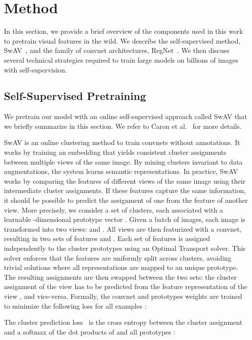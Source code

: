 \documentclass[final]{cvpr}
\begin{document}
\section{Method}

In this section, we provide a brief overview of the components used in this work to pretrain visual features in the wild.
We describe the self-supervised method, SwAV~\cite{caron2020unsupervised}, and the family of convnet architectures, RegNet~\cite{radosavovic2020designing}. 
We then discuss several technical strategies required to train large models on billions of images with self-supervision.

\subsection{Self-Supervised Pretraining}

We pretrain our model with an online self-supervised approach called SwAV that we briefly summarize in this section.
We refer to Caron et al.~\cite{caron2020unsupervised} for more details.

SwAV is an online clustering method to train convnets without annotations. It works by training an embedding that yields consistent cluster assignments between multiple views of the same image.
By mining clusters invariant to data augmentations, the system learns semantic representations.
In practice, SwAV works by comparing the features of different views of the same image using their intermediate cluster assignments.
If these features capture the same information, it should be possible to predict the assignment of one from the feature of another view.
More precisely, we consider a set of  clusters, each associated with a learnable -dimensional prototype vector .
Given a batch of  images, each image  is transformed into two views:  and .
All views are then featurized with a convnet, resulting in two sets of features  and .
Each set of features is assigned independently to the cluster prototypes using an Optimal Transport solver.
This solver enforces that the features are uniformly split across clusters, avoiding trivial solutions where all representations are mapped to an unique prototype.
The resulting assignments are then swapped between the two sets: the cluster assignment  of the view  has to be predicted from the feature representation  of the view , and vice-versa.
Formally, the convnet and prototypes weights are trained to minimize the following loss for all examples :


The cluster prediction loss~ is the cross entropy between the cluster assignment and a softmax of the dot products of  and all prototypes :
\end{document}
